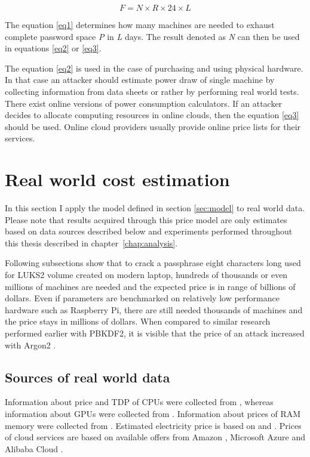 \documentclass[nolof]{fithesis3}
\begin{document}
\begin{equation}
\label{eq3}
F = N \times R \times 24 \times L
\end{equation}

The equation \ref{eq1} determines how many machines are needed to exhaust complete password space \emph{P} in \emph{L} days. The result denoted as \emph{N} can then be used in equations \ref{eq2} or \ref{eq3}.

The equation \ref{eq2} is used in the case of purchasing and using physical hardware. In that case an attacker should estimate power draw of single machine by collecting information from data sheets or rather by performing real world tests. There exist online versions of power consumption calculators. If an attacker decides to allocate computing resources in online clouds, then the equation \ref{eq3} should be used. Online cloud providers usually provide online price lists for their services.

\section{Real world cost estimation}
In this section I apply the model defined in section \ref{sec:model} to real world data. Please note that results acquired through this price model are only estimates based on data sources described below and experiments performed throughout this thesis described in chapter~\ref{chap:analysis}.

Following subsections show that to crack a passphrase eight characters long used for LUKS2 volume created on modern laptop, hundreds of thousands or even millions of machines are needed and the expected price is in range of billions of dollars. Even if parameters are benchmarked on relatively low performance hardware such as Raspberry Pi, there are still needed thousands of machines and the price stays in millions of dollars. When compared to similar research performed earlier with PBKDF2, it is visible that the price of an attack increased with Argon2 \parencite{pbkdfresearch}.

\subsection{Sources of real world data}
Information about price and TDP of CPUs were collected from \parencite{intelspecs}, whereas information about GPUs were collected from \parencites{teslak20}{teslap100}{geforceprice}{geforce}. Information about prices of RAM memory were collected from \parencite{memoryprice}. Estimated electricity price is based on \parencite{electricity} and \parencite{euroelectricity}. Prices of cloud services are based on available offers from Amazon \parencites{amazon}{amazoncalc}, Microsoft Azure \parencite{azure} and Alibaba Cloud \parencite{alibaba}.
\end{document}
